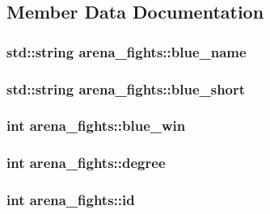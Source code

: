 \subsection{Member Data Documentation}
\hypertarget{classarena__fights_aecb4273fe2600cafccc859ed4d307af3}{
\subsubsection[{blue\-\_\-name}]{\setlength{\rightskip}{0pt plus 5cm}std\-::string arena\-\_\-fights\-::blue\-\_\-name}}\label{classarena__fights_aecb4273fe2600cafccc859ed4d307af3}
\hypertarget{classarena__fights_aa6f4b7b06ccdc44a7b8e4a41603e61f1}{
\subsubsection[{blue\-\_\-short}]{\setlength{\rightskip}{0pt plus 5cm}std\-::string arena\-\_\-fights\-::blue\-\_\-short}}\label{classarena__fights_aa6f4b7b06ccdc44a7b8e4a41603e61f1}
\hypertarget{classarena__fights_a7855849929c3cebb5e3c9f43965e9cb4}{
\subsubsection[{blue\-\_\-win}]{\setlength{\rightskip}{0pt plus 5cm}int arena\-\_\-fights\-::blue\-\_\-win}}\label{classarena__fights_a7855849929c3cebb5e3c9f43965e9cb4}
\hypertarget{classarena__fights_aa6db7e4d59b263d32c3fff2b8027a6f8}{
\subsubsection[{degree}]{\setlength{\rightskip}{0pt plus 5cm}int arena\-\_\-fights\-::degree}}\label{classarena__fights_aa6db7e4d59b263d32c3fff2b8027a6f8}
\hypertarget{classarena__fights_a7e1f42a6431003fb2f852eb6fb5e6afe}{
\subsubsection[{id}]{\setlength{\rightskip}{0pt plus 5cm}int arena\-\_\-fights\-::id}}\label{classarena__fights_a7e1f42a6431003fb2f852eb6fb5e6afe}
